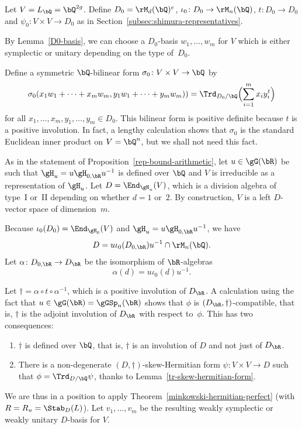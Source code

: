 Let $V = L_\bQ = \bQ^{2g}$.
Define $D_0 = \rM_d(\bQ)^e$, $\iota_0 \colon D_0 \to \rM_n(\bQ)$, $t \colon D_0 \to D_0$ and $\psi_0 \colon V \times V \to D_0$ as in Section~\ref{subsec:shimura-representatives}.

By Lemma~\ref{D0-basis}, we can choose a $D_0$-basis $w_1, \dotsc, w_m$ for $V$ which is either symplectic or unitary depending on the type of~$D_0$.

Define a symmetric $\bQ$-bilinear form $\sigma_0 \colon V \times V \to \bQ$ by
\[
\sigma_0(x_1w_1 + \dotsb + x_mw_m, y_1w_1 + \dotsb + y_mw_m)) = \Trd_{D_0/\bQ} \Bigl(\sum_{i=1}^m x_i y_i^t\Bigr)
\]
for all $x_1, \dotsc, x_m, y_1, \dotsc, y_m \in D_0$.
This bilinear form is positive definite because $t$ is a positive involution.
In fact, a lengthy calculation shows that $\sigma_0$ is the standard Euclidean inner product on $V = \bQ^n$, but we shall not need this fact.

As in the statement of Proposition~\ref{rep-bound-arithmetic}, let $u \in \gG(\bR)$ be such that $\gH_u = u\gH_{0,\bR}u^{-1}$ is defined over $\bQ$ and $V$ is irreducible as a representation of $\gH_u$.
Let $D = \End_{\gH_u}(V)$, which is a division algebra of type~I or~II depending on whether $d=1$ or~$2$.
By construction, $V$ is a left $D$-vector space of dimension~$m$.

Because $\iota_0(D_0) = \End_{\gH_0}(V)$ and $\gH_u = u\gH_{0,\bR}u^{-1}$, we have
\[
D = u\iota_0(D_{0,\bR})u^{-1} \cap \rM_n(\bQ).
\]
Let $\alpha \colon D_{0,\bR} \to D_\bR$ be the isomorphism of $\bR$-algebras
\[
\alpha(d) = u \iota_0(d) u^{-1}.
\]

Let $\dag = \alpha \circ t \circ \alpha^{-1}$, which is a positive involution of $D_\bR$.
A calculation using the fact that $u \in \gG(\bR) = \gGSp_n(\bR)$ shows that $\phi$ is $(D_\bR,\dag)$-compatible, that is, $\dag$ is the adjoint involution of $D_\bR$ with respect to~$\phi$.
This has two consequences:
\begin{enumerate}
\item $\dag$ is defined over $\bQ$, that is, $\dag$ is an involution of $D$ and not just of $D_\bR$.
\item There is a non-degenerate $(D,\dag)$-skew-Hermitian form $\psi \colon V \times V \to D$ such that $\phi = \Trd_{D/\bQ} \psi$, thanks to Lemma~\ref{tr-skew-hermitian-form}.
\end{enumerate}

We are thus in a position to apply Theorem~\ref{minkowski-hermitian-perfect} (with $R=R_u=\Stab_D(L)$).
Let $v_1, \dotsc, v_m$ be the resulting weakly symplectic or weakly unitary $D$-basis for $V$.

